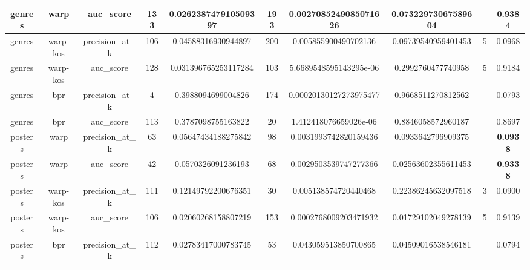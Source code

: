 \begin{table}
{\begin{tabular}{|c|c|c|c|c|c|c|c|c|c|}
\hline
genres                    & warp                  & auc\_score                & 133    & 0.026238747910509397  & 193           & 0.0027085249085071626  & 0.07322973067589604   &      & \textbf{0.9384}                    \\ 
\hline
genres                    & warp-kos              & precision\_at\_k          & 106    & 0.04588316930944897   & 200           & 0.005855900490702136   & 0.09739540959401453   & 5    & 0.0968                    \\ 
\hline
genres                    & warp-kos              & auc\_score                & 128    & 0.031396765253117284  & 103           & 5.6689548595143295e-06 & 0.2992760477740958    & 5    & 0.9184                    \\ 
\hline
genres                    & bpr                   & precision\_at\_k          & 4      & 0.3988094699004826    & 174           & 0.00020130127273975477 & 0.9668511270812562    &      & 0.0793                    \\ 
\hline
genres                    & bpr                   & auc\_score                & 113    & 0.3787098755163822    & 20            & 1.412418076659026e-06  & 0.8846058572960187    &      & 0.8697                    \\ 
\hline
posters                  & warp                  & precision\_at\_k          & 63     & 0.05647434188275842   & 98            & 0.0031993742820159436  & 0.0933642796909375    &      & \textbf{0.0938}                    \\ 
\hline
posters                  & warp                  & auc\_score                & 42     & 0.0570326091236193    & 68            & 0.0029503539747277366  & 0.02563602355611453   &      & \textbf{0.9338}                    \\ 
\hline
posters                  & warp-kos              & precision\_at\_k          & 111    & 0.12149792200676351   & 30            & 0.005138574720440468   & 0.22386245632097518   & 3    & 0.0900                    \\ 
\hline
posters                  & warp-kos              & auc\_score                & 106    & 0.02060268158807219   & 153           & 0.0002768009203471932  & 0.01729102049278139   & 5    & 0.9139                    \\ 
\hline
posters                  & bpr                   & precision\_at\_k          & 112    & 0.02783417000783745   & 53            & 0.043059513850700865   & 0.04509016538546181   &      & 0.0794                    \\ 

\end{tabular}}
\end{table}
